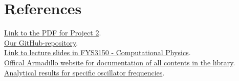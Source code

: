 \documentclass{article}
\begin{document}

\vspace{1cm}

\section{References} \label{sec:References}

\href{https://github.com/CompPhysics/ComputationalPhysics/blob/master/doc/Projects/2019/Project2/pdf/Project2.pdf}{Link to the PDF for Project 2}. \\

\href{https://github.com/Erikbgram/Fys3150}{Our GitHub-repository}. \\

\href{https://github.com/CompPhysics/ComputationalPhysics/blob/master/doc/Lectures/lectures2015.pdf}{Link to lecture slides in FYS3150 - Computational Physics}. \\

\href{http://arma.sourceforge.net/docs.html#eig_sym}{Offical Armadillo website for documentation of all contents in the library}. \\

\href{https://journals.aps.org/pra/pdf/10.1103/PhysRevA.48.3561}{Analytical results for specific oscillator frequencies}. \\








\end{document}
